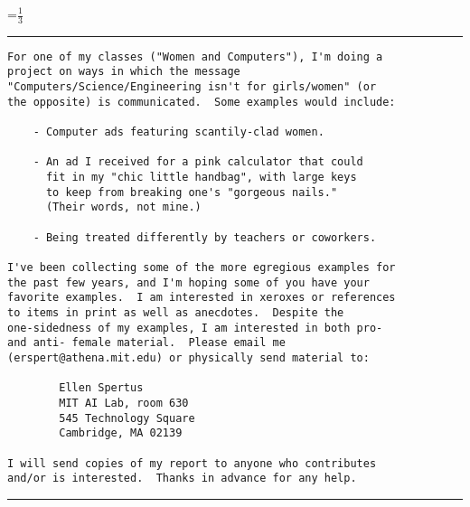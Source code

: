 {\newpage
\clearpage
\samepage \setbox\sizebox=\hbox{$\frac{1}{3}$}\box\sizebox
}

\appendix
{}
{\newpage
\clearpage
\samepage \begin{figure*}\hrule
\begin{verbatim}For one of my classes ("Women and Computers"), I'm doing a
project on ways in which the message
"Computers/Science/Engineering isn't for girls/women" (or
the opposite) is communicated.  Some examples would include:

	- Computer ads featuring scantily-clad women.

	- An ad I received for a pink calculator that could
	  fit in my "chic little handbag", with large keys
	  to keep from breaking one's "gorgeous nails."
	  (Their words, not mine.)

	- Being treated differently by teachers or coworkers.

I've been collecting some of the more egregious examples for
the past few years, and I'm hoping some of you have your
favorite examples.  I am interested in xeroxes or references
to items in print as well as anecdotes.  Despite the
one-sidedness of my examples, I am interested in both pro-
and anti- female material.  Please email me
(erspert@athena.mit.edu) or physically send material to:

		Ellen Spertus
		MIT AI Lab, room 630
		545 Technology Square
		Cambridge, MA 02139

I will send copies of my report to anyone who contributes
and/or is interested.  Thanks in advance for any help.
\end{verbatim}

\label{fig:req}
\hrule
\end{figure*}
}



